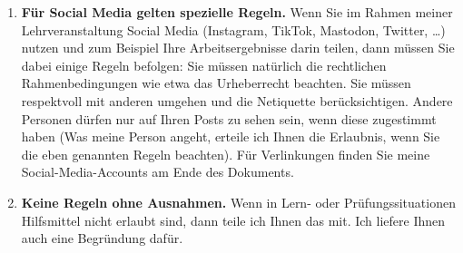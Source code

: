 \documentclass{../cssheet}
\begin{document}
\begin{enumerate}
\item \textbf{Für Social Media gelten spezielle Regeln.} Wenn Sie im Rahmen meiner Lehrveranstaltung Social Media (Instagram, TikTok, Mastodon, Twitter, \ldots) nutzen und zum Beispiel Ihre Arbeitsergebnisse darin teilen, dann müssen Sie dabei einige Regeln befolgen: Sie müssen natürlich die rechtlichen Rahmenbedingungen wie etwa das Urheberrecht beachten. Sie müssen respektvoll mit anderen umgehen und die Netiquette berücksichtigen. Andere Personen dürfen nur auf Ihren Posts zu sehen sein, wenn diese zugestimmt haben (Was meine Person angeht, erteile ich Ihnen die Erlaubnis, wenn Sie die eben genannten Regeln beachten). Für Verlinkungen finden Sie meine Social-Media-Accounts am Ende des Dokuments.
\item \textbf{Keine Regeln ohne Ausnahmen.} Wenn in Lern- oder Prüfungssituationen Hilfsmittel nicht erlaubt sind, dann teile ich Ihnen das mit. Ich liefere Ihnen auch eine Begründung dafür.
\end{enumerate}

\newpage
\printbibliography[keyword=rulesfortools,title=References]

\vspace*{10mm}
\printlicense

\printsocials
\end{document}
